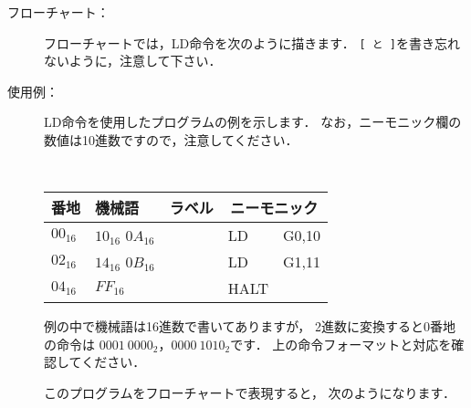 \begin{description}
\item[フローチャート：]フローチャートでは，LD命令を次のように描きます．
{\tt [ と ]}を書き忘れないように，注意して下さい．
\begin{flushleft}
\epsfxsize=3cm
\end{flushleft}

\item[使用例：]LD命令を使用したプログラムの例を示します．
なお，ニーモニック欄の数値は10進数ですので，注意してください．

{\tt
\begin{tabular}{|l|l|l|l l|} \hline
番地 & 機械語 & ラベル & \multicolumn{2}{|c|}{ニーモニック} \\
\hline
$00_{16}$ & $10_{16}$ $0A_{16}$ & & LD   & G0,10 \\
$02_{16}$ & $14_{16}$ $0B_{16}$ & & LD   & G1,11 \\
$04_{16}$ & $FF_{16}$           & & HALT &       \\
\hline
\end{tabular}
}

例の中で機械語は16進数で書いてありますが，
2進数に変換すると0番地の命令は $0001~0000_2$，$0000~1010_2$です．
上の命令フォーマットと対応を確認してください．

このプログラムをフローチャートで表現すると，
次のようになります．

\begin{flushleft}
\epsfxsize=3cm
\end{flushleft}

\end{description}


\vfill
\begin{center}
\end{center}

\begin{center}
\end{center}

